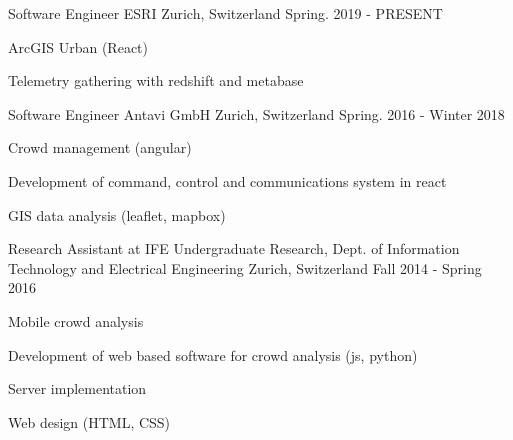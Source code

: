 

\begin{cventries}

  \cventry
    {Software Engineer} %
    {ESRI} %
    {Zurich, Switzerland} %
    {Spring. 2019 - PRESENT} %
    {
      \begin{cvitems} %
        \item {ArcGIS Urban (React) }
        \item {Telemetry gathering with redshift and metabase}
      \end{cvitems}
    }

  \cventry
    {Software Engineer} %
    {Antavi GmbH} %
    {Zurich, Switzerland} %
    {Spring. 2016 - Winter 2018} %
    {
      \begin{cvitems} %
        \item {Crowd management (angular)}
        \item {Development of command, control and communications system in react }
        \item {GIS data analysis (leaflet, mapbox)}
      \end{cvitems}
    }

  \cventry
    {Research Assistant at IFE} %
    {Undergraduate Research, Dept. of Information Technology and Electrical Engineering} %
    {Zurich, Switzerland} %
    {Fall 2014 - Spring 2016} %
    {
      \begin{cvitems} %
        \item {Mobile crowd analysis }
        \item {Development of web based software for crowd analysis (js, python)}
        \item {Server implementation}
        \item {Web design (HTML, CSS)}
      \end{cvitems}
    }


\end{cventries}
